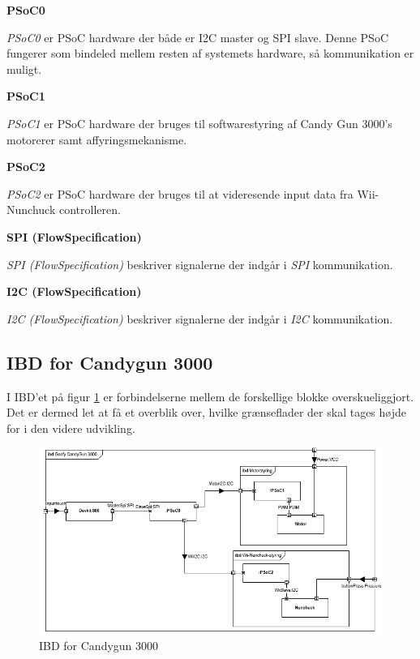 \textbf{PSoC0}

\textit{PSoC0} er PSoC hardware der både er I2C master og SPI slave. Denne PSoC fungerer som bindeled mellem resten af systemets hardware, så kommunikation er muligt.

\textbf{PSoC1}

\textit{PSoC1} er PSoC hardware der bruges til softwarestyring af Candy Gun 3000's motorerer samt affyringsmekanisme.

\textbf{PSoC2}

\textit{PSoC2} er PSoC hardware der bruges til at videresende input data fra Wii-Nunchuck controlleren.	

\textbf{SPI (FlowSpecification)}

\textit{SPI (FlowSpecification)} beskriver signalerne der indgår i \textit{SPI} kommunikation.

\textbf{I2C (FlowSpecification)}

\textit{I2C (FlowSpecification)} beskriver signalerne der indgår i \textit{I2C} kommunikation.
\subsection{IBD for Candygun 3000}
I IBD'et på figur \ref{fig:IBD} er forbindelserne mellem de forskellige blokke overskueliggjort. Det er dermed let at få et overblik over, hvilke grænseflader der skal tages højde for i den videre udvikling. 

\begin{figure}[H]
	\centering
	\includegraphics[width=\textwidth]{Systemarkitektur/images/GoofycandygunIBD.png}
	\caption{IBD for Candygun 3000}
	\label{fig:IBD}
\end{figure}

